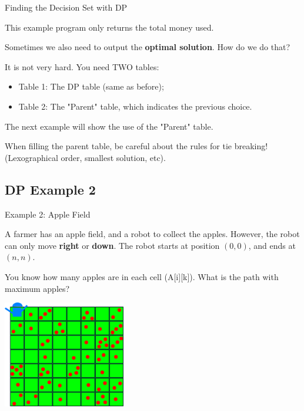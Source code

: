 \begin{frame}{Finding the Decision Set with DP}

  This example program only returns the total money used.\bigskip

  Sometimes we also need to output the {\bf optimal solution}. How do we do that?
  \bigskip

  It is not very hard. You need TWO tables:
  \begin{itemize}
    \item Table 1: The DP table (same as before);
    \item Table 2: The "Parent" table, which indicates the previous choice.
  \end{itemize}
  \bigskip

  The next example will show the use of the "Parent" table. \bigskip

  \begin{block}{}
    When filling the parent table, be careful about the rules for tie breaking!\\
    (Lexographical order, smallest solution, etc).
  \end{block}
\end{frame}

\subsection{DP Example 2}

\begin{frame}{Example 2: Apple Field}
  \begin{block}{}
  {\smaller
  A farmer has an apple field, and a robot to collect the apples. However, the robot can only move {\bf right} or {\bf down}. The robot starts at position $(0,0)$, and ends at $(n,n)$.\medskip

  You know how many apples are in each cell (A[i][k]). What is the path with maximum apples?
}
  \end{block}

  \begin{center}
    \includegraphics[width=0.4\textwidth]{../img/applefield}
  \end{center}
\end{frame}

